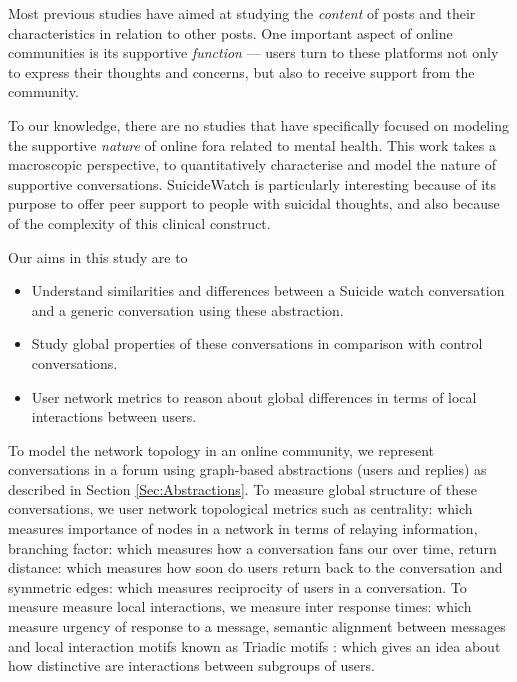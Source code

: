 Most previous studies have aimed at studying the \emph{content} of posts and their characteristics in relation to other posts. One important aspect of online communities is its supportive \emph{function} --- users turn to these platforms not only to express their thoughts and concerns, but also to receive support from the community. 

To our knowledge, there are no studies that have specifically focused on modeling the supportive \emph{nature} of online fora related to mental health. This work takes a macroscopic perspective, to quantitatively characterise and model the nature of supportive conversations. SuicideWatch is particularly interesting because of its purpose to offer peer support to people with suicidal thoughts, and also because of the complexity of this clinical construct.

Our aims in this study are to 
\begin{itemize} 
    \item Understand similarities and differences between a Suicide watch conversation and a generic conversation using these abstraction. 
    \item Study global properties of these conversations in comparison with control conversations. 
    \item User network metrics to reason about global differences in terms of local interactions between users. 
\end{itemize}


To model the network topology in an online community, we represent conversations in a forum using graph-based abstractions (users and replies) as described in Section \ref{Sec:Abstractions}. 
To measure global structure of these conversations, we user network topological metrics such as centrality: which measures importance of nodes in a network in terms of relaying information, branching factor: which measures how a conversation fans our over time, return distance: which measures how soon do users return back to the conversation and symmetric edges: which measures reciprocity of users in a conversation. To measure measure local interactions, we measure inter response times: which measure urgency of response to a message, semantic alignment between messages and local interaction motifs known as Triadic motifs : which gives an idea about how distinctive are interactions between subgroups of users. 


